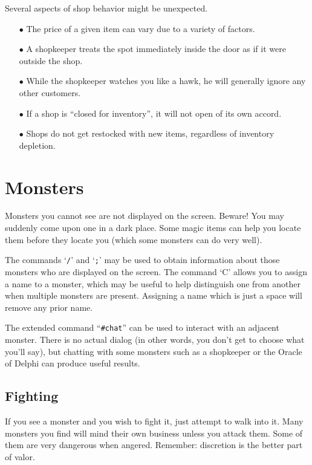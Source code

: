 Several aspects of shop behavior might be unexpected.
\begin{itemize}
\item[$\bullet$]
The price of a given item can vary due to a variety of factors.
\item[$\bullet$]
A shopkeeper treats the spot immediately inside the door as if it were
outside the shop.
\item[$\bullet$]
While the shopkeeper watches you like a hawk, he will generally ignore
any other customers.
\item[$\bullet$]
If a shop is ``closed for inventory'', it will not open of its own accord.
\item[$\bullet$]
Shops do not get restocked with new items, regardless of inventory depletion.
\end{itemize}

\section{Monsters}

Monsters you cannot see are not displayed on the screen.  Beware!
You may suddenly come upon one in a dark place.  Some magic items can
help you locate them before they locate you (which some monsters can do
very well).

The commands `{\tt /}' and `{\tt ;}' may be used to obtain information
about those
monsters who are displayed on the screen.  The command `C' allows you
to assign a name to a monster, which may be useful to help distinguish
one from another when multiple monsters are present.  Assigning a name
which is just a space will remove any prior name.

The extended command ``{\tt \#chat}'' can be used to interact with an adjacent
monster.  There is no actual dialog (in other words, you don't get to
choose what you'll say), but chatting with some monsters such as a
shopkeeper or the Oracle of Delphi can produce useful results.
\subsection*{Fighting}

If you see a monster and you wish to fight it, just attempt to walk
into it.  Many monsters you find will mind their own business unless
you attack them.  Some of them are very dangerous when angered.
Remember:  discretion is the better part of valor.


